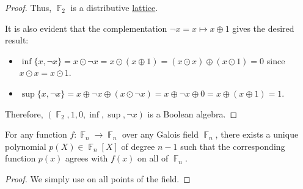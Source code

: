 \begin{proof}
  Thus, \( \BbbF_2 \) is a distributive \hyperref[def:semilattice/distributive_lattice]{lattice}.

  It is also evident that the complementation \( \neg x = x \mapsto x \oplus 1 \) gives the desired result:
  \begin{itemize}
    \item \( \inf \{ x, \neg x \} = x \odot \neg x = x \odot (x \oplus 1) = (x \odot x) \oplus (x \odot 1) = 0 \) since \( x \odot x = x \odot 1 \).
    \item \( \sup \{ x, \neg x \} = x \oplus \neg x \oplus (x \odot \neg x) = x \oplus \neg x \oplus 0 = x \oplus (x \oplus 1) = 1 \).
  \end{itemize}

  Therefore, \( (\BbbF_2, 1, 0, \inf, \sup, \neg x ) \) is a Boolean algebra.
\end{proof}

\begin{proposition}
  For any function \( f: \BbbF_n \to \BbbF_n \) over any Galois field \( \BbbF_n \), there exists a unique polynomial \( p(X) \in \BbbF_n[X] \) of degree \( n - 1 \) such that the corresponding function \( p(x) \) agrees with \( f(x) \) on all of \( \BbbF_n \).
\end{proposition}
\begin{proof}
  We simply use  on all points of the field.
\end{proof}


